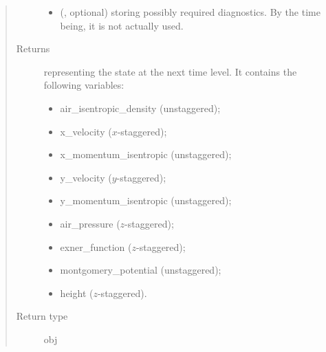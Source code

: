 \documentclass[letterpaper,10pt,english]{sphinxmanual}
\begin{document}
\begin{fulllineitems}
\begin{fulllineitems}
\begin{quote}
\begin{description}
\begin{itemize}
\item {} 
 (, optional) \textendash{} {\hyperref[\detokenize{api:storages.grid_data.GridData}]{}} storing possibly required diagnostics.
By the time being, it is not actually used.

\end{itemize}

\item[{Returns}] \leavevmode

{\hyperref[\detokenize{api:storages.state_isentropic.StateIsentropic}]{}} representing the state at the next time level.
It contains the following variables:
\begin{itemize}
\item {} 
air\_isentropic\_density (unstaggered);

\item {} 
x\_velocity (\(x\)-staggered);

\item {} 
x\_momentum\_isentropic (unstaggered);

\item {} 
y\_velocity (\(y\)-staggered);

\item {} 
y\_momentum\_isentropic (unstaggered);

\item {} 
air\_pressure (\(z\)-staggered);

\item {} 
exner\_function (\(z\)-staggered);

\item {} 
montgomery\_potential (unstaggered);

\item {} 
height (\(z\)-staggered).

\end{itemize}


\item[{Return type}] \leavevmode
obj

\end{description}\end{quote}

\end{fulllineitems}



\end{fulllineitems}
\end{document}
